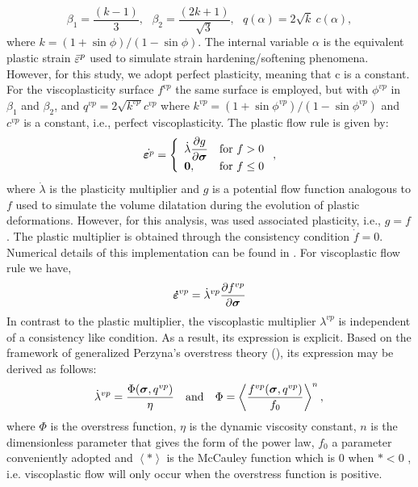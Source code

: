\documentclass[Journal,letterpaper, NoLists,SectionNumbers]{ascelike-new}
\begin{document}
\begin{equation}
	\label{eq:f_DP_inscrita_MC}
	\beta_1 = \dfrac{(k-1)}{3}, ~~~ \beta_2 = \dfrac{(2k+1)}{\sqrt{3}}, ~~~
	q(\alpha) = 2\sqrt{k}~c(\alpha),
\end{equation}
where $k = (1+\sin{\phi})/(1-\sin{\phi})$. The internal variable $\alpha$ is the equivalent plastic strain $\bar \varepsilon^p$ used to simulate strain hardening/softening phenomena. However, for this study, we adopt perfect plasticity, meaning that c is a constant. For the viscoplasticity surface $f^{vp}$ the same surface is employed, but with $\phi^{vp}$ in $\beta_1$ and $\beta_2$, and $q^{vp} = 2\sqrt{k^{vp}}c^{vp}$ where $k^{vp} = (1+\sin{\phi^{vp}})/(1-\sin{\phi^{vp}})$ and $c^{vp}$ is a constant, i.e., perfect viscoplasticity. 
The plastic flow rule is given by:
\begin{equation}
	\label{eq_plastic_flow}
	\dot {\boldsymbol{\varepsilon}^{p}} = \left\{ 
	\begin{array}{ll} 
		\dot \lambda \dfrac{\partial g}{\partial \boldsymbol{\sigma}} &  \text{for } f > 0 \\ 
		\boldsymbol 0, & \text{for } f \le 0 \\
	\end{array}\right.,
\end{equation}
where $\dot \lambda$ is the plasticity multiplier and $g$ is a potential flow function analogous to $f$ used to simulate the volume dilatation during the evolution of plastic deformations. However, for this analysis, was used associated plasticity, i.e., $g=f$. The plastic multiplier is obtained through the consistency condition $\dot f = 0$. Numerical details of this implementation can be found in . For viscoplastic flow rule we have,
\begin{equation}
	\label{eq_viscoplastic_flow}
	\boldsymbol{\dot{\varepsilon}}^{vp} = \dot \lambda^{vp} \dfrac{\partial f^{vp}}{\partial \boldsymbol{\sigma}}
\end{equation}
In contrast to the plastic multiplier, the viscoplastic multiplier $\lambda^{vp}$ is independent of a consistency like condition. As a result, its expression is explicit. Based on the framework of generalized Perzyna's overstress theory (), its expression may be derived as follows:
\begin{equation} \label{eq_perzyna_model}
	\dot \lambda^{vp} = \dfrac{\Phi(\boldsymbol{\sigma},q^{vp})}{\eta}~~~\text{and}~~~\Phi = \left\langle  \dfrac{f^{vp}(\boldsymbol{\sigma},q^{vp})}{f_0} \right\rangle^n, \,
\end{equation} where $\Phi$ is the overstress function, $\eta$ is the dynamic viscosity constant, $n$ is the dimensionless parameter that gives the form of the power law, $f_0$ a parameter conveniently adopted and $\left\langle * \right\rangle$ is the McCauley function which is $0$ when $* <0$ , i.e. viscoplastic flow will only occur when the overstress function is positive.
\end{document}
